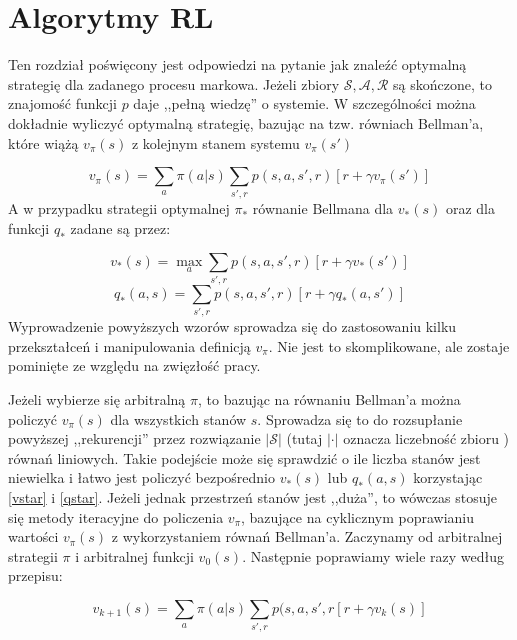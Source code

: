 \documentclass[licencjacka]{pracamgr}
\begin{document}
\section{Algorytmy RL}

Ten rozdział poświęcony jest odpowiedzi na pytanie jak znaleźć optymalną strategię dla zadanego procesu markowa. Jeżeli zbiory  $\mathcal{S}, \mathcal{A}, \mathcal{R}$ są skończone, to znajomość funkcji $p$ daje ,,pełną wiedzę'' o systemie. W szczególności można dokładnie wyliczyć optymalną strategię, bazując na tzw. równiach Bellman'a, które wiążą $v_{\pi}(s)$ z kolejnym stanem systemu $v_{\pi}(s')$

\begin{equation}
	v_{\pi}(s) = \sum_{a}\pi(a|s)\sum_{s',r}p(s,a,s',r)[r +\gamma v_{\pi}(s')] 
\end{equation}
A w przypadku strategii optymalnej $\pi_{*}$ równanie Bellmana dla $v_{*}(s)$ oraz dla funkcji $q_{*}$ zadane są przez:

\begin{equation}\label{vstar}
	v_{*}(s) = \max_{a}\sum_{s',r}p(s,a,s',r)[r +\gamma v_{*}(s')]
\end{equation}
\begin{equation}\label{qstar}
	q_{*}(a, s) = \sum_{s',r}p(s,a,s',r)[r +\gamma q_{*}(a,s')]
\end{equation}
Wyprowadzenie powyższych wzorów sprowadza się do zastosowaniu kilku przekształceń i manipulowania definicją $v_{\pi}$. Nie jest to skomplikowane, ale zostaje pominięte ze względu na zwięzłość pracy. 

Jeżeli wybierze się arbitralną  $\pi$, to bazując na równaniu Bellman'a można policzyć $v_{\pi}(s)$ dla wszystkich stanów $s$. Sprowadza się to do rozsupłanie powyższej ,,rekurencji''  przez rozwiązanie $|\mathcal{S}|$  (tutaj $|\cdot|$ oznacza liczebność zbioru ) równań liniowych. Takie podejście może się sprawdzić o ile liczba stanów jest niewielka i łatwo jest policzyć bezpośrednio $v_{*}(s)$ lub $q_{*}(a,s)$ korzystając \ref{vstar} i \ref{qstar}.  Jeżeli jednak przestrzeń stanów jest ,,duża'', to  wówczas stosuje się metody iteracyjne do policzenia $v_{\pi}$, bazujące na cyklicznym poprawianiu wartości $v_{\pi}(s)$ z wykorzystaniem równań Bellman'a. Zaczynamy od arbitralnej strategii $\pi$ i arbitralnej funkcji $v_{0}(s)$. Następnie poprawiamy wiele razy według przepisu:

\begin{equation}\label{GPI}
	v_{k+1}(s) = \sum_{a}\pi(a|s)\sum_{s',r}p(s,a,s',r[r+\gamma v_{k}(s)]
\end{equation}
\end{document}
